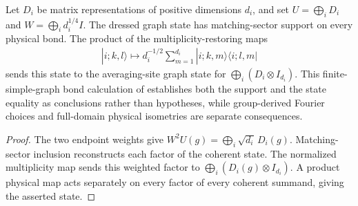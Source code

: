 \begin{lemma}%
    \label{thm:peps_graph_multiplicity_bond_state}
    \leanok
    Let $D_i$ be matrix representations of positive dimensions $d_i$, and set
    $U=\bigoplus_iD_i$ and $W=\bigoplus_i d_i^{1/4}I$.
    The dressed graph state has matching-sector support on every
    physical bond. The product of the multiplicity-restoring maps
    \begin{align}
        |i;k,l\rangle\longmapsto d_i^{-1/2}
        \sum_{m=1}^{d_i}|i;k,m\rangle\langle i;l,m|
    \end{align}
    sends this state to the averaging-site graph state for
    $\bigoplus_i(D_i\otimes I_{d_i})$.
    This finite-simple-graph bond calculation of
    \cite[Section~7]{Schuch2010PEPS} establishes both the support and the
    state equality as conclusions rather than hypotheses, while group-derived
    Fourier choices and full-domain physical isometries are separate consequences.
\end{lemma}
\begin{proof}\leanok
    The two endpoint weights give
    $W^2U(g)=\bigoplus_i\sqrt{d_i}\,D_i(g)$.
    Matching-sector inclusion reconstructs each factor of the coherent
    state. The normalized multiplicity map sends this weighted factor to
    $\bigoplus_i(D_i(g)\otimes I_{d_i})$.
    A product physical map acts separately on every factor of every coherent
    summand, giving the asserted state.
\end{proof}
